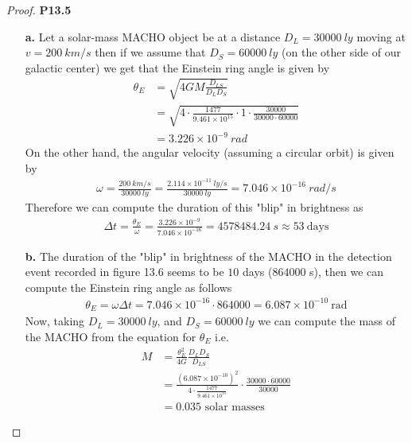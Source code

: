 \documentclass[11pt]{article}
\theoremstyle{definition}
\begin{document}
\cleardoublepage
\begin{proof}{\textbf{P13.5}}
\begin{itemize}
\item [\textbf{a.}] Let a solar-mass MACHO object be at a distance $D_L = 30000~ly$
moving at $v = 200~km/s$ then if we assume that $D_S = 60000~ly$
(on the other side of our galactic center) we get that the Einstein ring angle
is given by
\begin{align*}
    \theta_E &= \sqrt{4GM \frac{D_{LS}}{D_LD_S}}\\
    &= \sqrt{4 \cdot \frac{1477}{9.461 \times 10^{15}} \cdot 1 \cdot \frac{30000}{30000 \cdot 60000}}\\
    &= 3.226 \times 10^{-9}~rad
\end{align*}
On the other hand, the angular velocity (assuming a circular orbit) is given by
\begin{align*}
    \omega = \frac{200~km/s}{30000~ly} = \frac{2.114 \times 10^{-11}~ly/s}{30000~ly}
    = 7.046 \times 10^{-16}~rad/s
\end{align*}
Therefore we can compute the duration of this "blip" in brightness as
\begin{align*}
    \Delta t = \frac{\theta_E}{\omega}
    = \frac{3.226 \times 10^{-9}}{7.046 \times 10^{-16}}
    = 4578484.24~s \approx 53~\text{days}
\end{align*}
\item [\textbf{b.}] The duration of the "blip" in brightness of the MACHO
in the detection event recorded in figure 13.6 seems to be $10$ days
($864000$ s), then we can compute the Einstein ring angle as follows
\begin{align*}
    \theta_E = \omega \Delta t
    = 7.046 \times 10^{-16} \cdot 864000
    = 6.087 \times 10^{-10}~\text{rad}
\end{align*}
Now, taking $D_L = 30000~ly$, and $D_S = 60000~ly$ we can compute the mass
of the MACHO from the equation for $\theta_E$ i.e.
\begin{align*}
    M &= \frac{\theta_E^2}{4G}\frac{D_LD_S}{D_{LS}}\\
    &= \frac{(6.087 \times 10^{-10})^2}
    {4 \cdot \frac{1477}{9.461 \times 10^{15}}}
    \cdot \frac{30000 \cdot 60000}{30000}\\[7pt]
    &= 0.035 \text{ solar masses}
\end{align*}

\end{itemize}
\end{proof}
\end{document}
